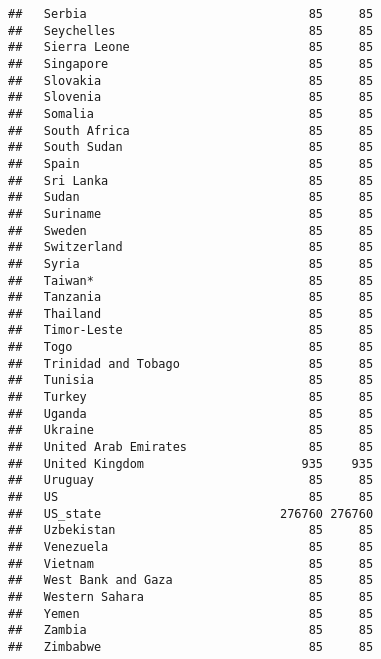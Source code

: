 \documentclass[]{article}
\begin{document}
\begin{verbatim}
##   Serbia                               85     85
##   Seychelles                           85     85
##   Sierra Leone                         85     85
##   Singapore                            85     85
##   Slovakia                             85     85
##   Slovenia                             85     85
##   Somalia                              85     85
##   South Africa                         85     85
##   South Sudan                          85     85
##   Spain                                85     85
##   Sri Lanka                            85     85
##   Sudan                                85     85
##   Suriname                             85     85
##   Sweden                               85     85
##   Switzerland                          85     85
##   Syria                                85     85
##   Taiwan*                              85     85
##   Tanzania                             85     85
##   Thailand                             85     85
##   Timor-Leste                          85     85
##   Togo                                 85     85
##   Trinidad and Tobago                  85     85
##   Tunisia                              85     85
##   Turkey                               85     85
##   Uganda                               85     85
##   Ukraine                              85     85
##   United Arab Emirates                 85     85
##   United Kingdom                      935    935
##   Uruguay                              85     85
##   US                                   85     85
##   US_state                         276760 276760
##   Uzbekistan                           85     85
##   Venezuela                            85     85
##   Vietnam                              85     85
##   West Bank and Gaza                   85     85
##   Western Sahara                       85     85
##   Yemen                                85     85
##   Zambia                               85     85
##   Zimbabwe                             85     85
\end{verbatim}
\end{document}
